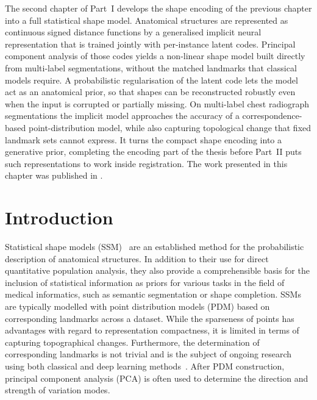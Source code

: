 The second chapter of Part~I develops the shape encoding of the previous chapter into a
full statistical shape model. Anatomical structures are represented as continuous signed
distance functions by a generalised implicit neural representation that is trained jointly
with per-instance latent codes. Principal component analysis of those codes yields a
non-linear shape model built directly from multi-label segmentations, without the matched
landmarks that classical models require. A probabilistic regularisation of the latent code
lets the model act as an anatomical prior, so that shapes can be reconstructed robustly even
when the input is corrupted or partially missing. On multi-label chest radiograph
segmentations the implicit model approaches the accuracy of a correspondence-based
point-distribution model, while also capturing topological change that fixed landmark sets
cannot express. It turns the compact shape encoding into a generative prior, completing the
encoding part of the thesis before Part~II puts such representations to work inside
registration. The work presented in this chapter was published in
\citep{grossbrohmer2025robust}.



\section{Introduction}
Statistical shape models (SSM)~\citep{cootes1995active} are an established method for the probabilistic description of anatomical structures. In addition to their use for direct quantitative population analysis, they also provide a comprehensible basis for the inclusion of statistical information as priors for various tasks in the field of medical informatics, such as semantic segmentation or shape completion. SSMs are typically modelled with point distribution models (PDM) \citep{cootes1995active} based on corresponding landmarks across a dataset. While the sparseness of points has advantages with regard to representation compactness, it is limited in terms of capturing topographical changes. Furthermore, the determination of corresponding landmarks is not trivial and is the subject of ongoing research using both classical and deep learning methods~\citep{adams2023point2ssm}. After PDM construction, principal component analysis (PCA) is often used to determine the direction and strength of variation modes. 

